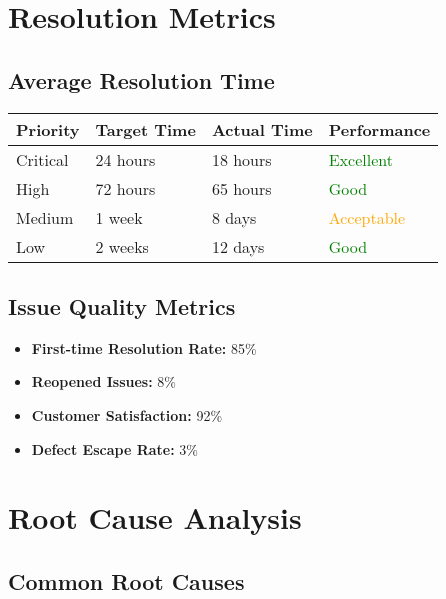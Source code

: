 \documentclass[12pt,a4paper]{article}
\begin{document}
\section{Resolution Metrics}

\subsection{Average Resolution Time}

\begin{longtable}{|p{2.5cm}|p{2.5cm}|p{2.5cm}|p{4.5cm}|}
\hline
\textbf{Priority} & \textbf{Target Time} & \textbf{Actual Time} & \textbf{Performance} \\
\hline
Critical & 24 hours & 18 hours & \textcolor{green}{Excellent} \\
\hline
High & 72 hours & 65 hours & \textcolor{green}{Good} \\
\hline
Medium & 1 week & 8 days & \textcolor{orange}{Acceptable} \\
\hline
Low & 2 weeks & 12 days & \textcolor{green}{Good} \\
\hline
\end{longtable}

\subsection{Issue Quality Metrics}

\begin{itemize}
    \item \textbf{First-time Resolution Rate:} 85\%
    \item \textbf{Reopened Issues:} 8\%
    \item \textbf{Customer Satisfaction:} 92\%
    \item \textbf{Defect Escape Rate:} 3\%
\end{itemize}

\section{Root Cause Analysis}

\subsection{Common Root Causes}
\end{document}
